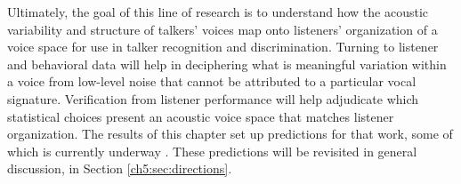 Ultimately, the goal of this line of research is to understand how the acoustic variability and structure of talkers' voices map onto listeners' organization of a voice space for use in talker recognition and discrimination. Turning to listener and behavioral data will help in deciphering what is meaningful variation within a voice from low-level noise that cannot be attributed to a particular vocal signature. Verification from listener performance will help adjudicate which statistical choices present an acoustic voice space that matches listener organization. The results of this chapter set up predictions for that work, some of which is currently underway \citep{lloy_2020_bilingual,lloy_2021_examining}. These predictions will be revisited in general discussion, in Section \ref{ch5:sec:directions}.

\endinput %
